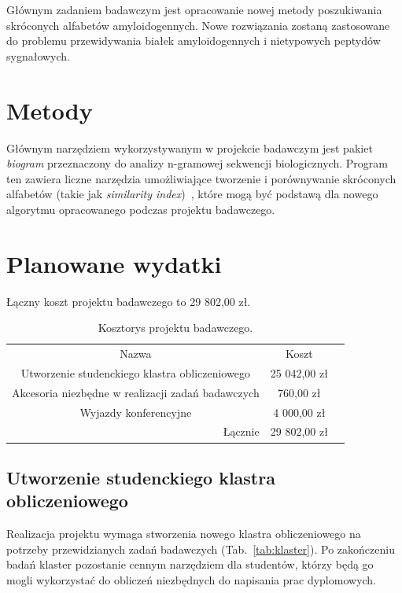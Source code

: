 \documentclass{article}
\begin{document}
Głównym zadaniem badawczym jest opracowanie nowej metody poszukiwania 
skróconych alfabetów amyloidogennych. Nowe rozwiązania zostaną zastosowane do 
problemu przewidywania białek amyloidogennych i nietypowych peptydów 
sygnałowych.

\section{Metody}

Głównym narzędziem wykorzystywanym w projekcie badawczym jest pakiet 
\textit{biogram} przeznaczony do analizy n-gramowej sekwencji biologicznych. 
Program ten zawiera liczne narzędzia umożliwiające tworzenie i porównywanie 
skróconych alfabetów (takie jak \textit{similarity 
index})~\citep{stephenson_unearthing_2013}, które mogą być podstawą dla nowego 
algorytmu opracowanego podczas projektu badawczego.


\section{Planowane wydatki}

Łączny koszt projektu badawczego to 29 802,00 zł.

\begin{table}[!htbp]
\centering
\caption*{Kosztorys projektu badawczego.}
\begin{tabular}{rrr}
\cline{1-2}
\multicolumn{1}{|c}{Nazwa}                                   & \multicolumn{1}{|c|}{Koszt}   &  \\ \cline{1-2}
\multicolumn{1}{|c}{Utworzenie studenckiego klastra obliczeniowego} & 
\multicolumn{1}{|c|}{25 042,00 zł} &  \\ \cline{1-2}
\multicolumn{1}{|c}{Akcesoria niezbędne w realizacji zadań badawczych}   & 
\multicolumn{1}{|c|}{760,00 zł} &  \\ \cline{1-2}
\multicolumn{1}{|c}{Wyjazdy konferencyjne}   & 
\multicolumn{1}{|c|}{4 000,00 zł} &  \\ \cline{1-2}
Łącznie    & 29 802,00 zł                    & 
\end{tabular}
\end{table}

\subsection{Utworzenie studenckiego klastra obliczeniowego}

Realizacja projektu wymaga stworzenia nowego klastra obliczeniowego na potrzeby 
przewidzianych zadań badawczych (Tab.~\ref{tab:klaster}). Po zakończeniu badań 
klaster pozostanie cennym narzędziem dla studentów, którzy będą go mogli 
wykorzystać do obliczeń niezbędnych do napisania prac dyplomowych.
\end{document}
